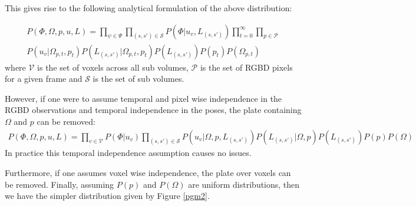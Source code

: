 This gives rise to the following analytical formulation of the above distribution:

\begin{equation}
\begin{split}
P(\Phi, \Omega, p, u, L) = 
\prod_{\psi \in \Psi}\prod_{(s, s') \in \mathcal{S}}P(\Phi|u_{v}, L_{(s, s')}) 
\prod_{t=0}^{\infty}\prod_{p \in \mathcal{P}}\\
P(u_{v}|\Omega_{p, t}, p_{t})
P(L_{(s, s')}|\Omega_{p, t}, p_{t})
P(L_{(s, s')})P(p_{t})P(\Omega_{p, t})
\end{split}
\end{equation}
where $\mathcal{V}$ is the set of voxels across all sub volumes, $\mathcal{P}$ is the set of RGBD pixels for a given 
frame and $\mathcal{S}$ is the set of sub volumes.

However, if one were to assume temporal and pixel wise independence in the RGBD observations and temporal independence in 
the poses, the plate containing $\Omega$ and $p$ can be removed:
\begin{equation}
\begin{split}
P(\Phi, \Omega, p, u, L) = 
\prod_{v \in \mathcal{V}}P(\Phi|u_{v})
\prod_{(s, s') \in \mathcal{S}}P(u_{v}|\Omega, p, L_{(s, s')})
P(L_{(s, s')}|\Omega, p) P(L_{(s, s')})P(p)P(\Omega)
\end{split}
\end{equation}
In practice this temporal independence assumption causes no issues.

Furthermore, if one assumes voxel wise independence, the plate over voxels can be removed. Finally, assuming $P(p)$ and 
$P(\Omega)$ are uniform distributions, then we have the simpler distribution given by Figure \ref{pgm2}.


